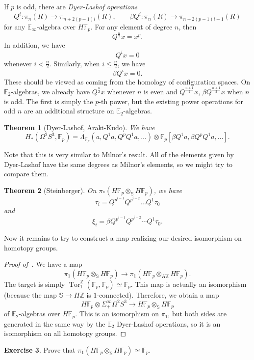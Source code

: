 \documentclass[10pt, oneside]{memoir}
\newtheorem{thm}{Theorem}[subsection]
\theoremstyle{definition}
\newtheorem{exer}[thm]{Exercise}
\theoremstyle{remark}
\theoremstyle{plain}
\theoremstyle{definition}
\theoremstyle{remark}
\newcommand{\Z}{\mathbb{Z}}
\newcommand{\E}{\mathbb{E}}
\newcommand{\F}{\mathbb{F}}
\newcommand{\bS}{\mathbb{S}}
\newcommand{\1}{\mathbf{1}}
\newcommand{\2}{\mathbf{2}}
\newcommand{\3}{\mathbf{3}}
\DeclareMathOperator{\Tor}{Tor}
\begin{document}
If $p$ is odd, there are \textit{Dyer-Lashof operations}
\[ Q^i \colon \pi_n(R) \to \pi_{n+2(p-1)i}(R), \qquad \beta Q^i \colon \pi_n(R) \to \pi_{n+2(p-1)i-1}(R) \]
for any $\E_{\infty}$-algebra over $H \F_p$. For any element of degree $n$, then
\[ Q^{\frac{n}{2}} x = x^p. \]
In addition, we have
\[ Q^i x = 0 \]
whenever $i < \frac{n}{2}$. Similarly, when $i \leq \frac{n}{2}$, we have
\[ \beta Q^i x = 0. \]
These should be viewed as coming from the homology of configuration spaces. On $\E_2$-algebras, we already have $Q^{\frac{n}{2}} x$
whenever $n$ is even and $Q^{\frac{n+1}{2}}x$, $\beta Q^{\frac{n+1}{2}}x$ when $n$ is odd. The first is simply the $p$-th power, but the existing power operations for odd $n$ are an additional structure on $\E_2$-algebras.

\begin{thm}[Dyer-Lashof, Araki-Kudo]
    We have
    \[ H_*(\Omega^2 S^3, \F_p) = \Lambda_{\F_p} (a, Q^1 a, Q^p Q^1 a, \ldots) \otimes \F_p[\beta Q^1 a, \beta Q^p Q^1 a, \ldots]. \]
\end{thm}

Note that this is very similar to Milnor's result. All of the elements given by Dyer-Lashof have the same degrees as Milnor's elements, so we might try to compare them.

\begin{thm}[Steinberger]
    On $\pi_* (H \F_p \otimes_{\bS} H \F_p)$, we have
    \[ \tau_i = Q^{p^{i-1}} Q^{p^{i-2}} \dots Q^1 \tau_0 \]
    and
    \[ \xi_i = \beta Q^{p^{i-1}} Q^{p^{i-2}} \cdots Q^1 \tau_0. \]
\end{thm}

Now it remains to try to construct a map realizing our desired isomorphism on homotopy groups.

\begin{proof}[Proof of~]
    We have a map
    \[ \pi_1 (H \F_p \otimes_{\bS} H \F_p) \to \pi_1 (H \F_p \otimes_{H \Z} H \F_p). \]
    The target is simply $\Tor_1^{\Z}(\F_p, \F_p) \simeq \F_p$. This map is actually an isomorphism (because the map $\bS \to H \Z$ is $1$-connected). Therefore, we obtain a map
    \[ H \F_p \otimes \Sigma_+^{\infty} \Omega^2 S^3 \to H \F_p \otimes_{\bS} H \F_p \]
    of $\E_2$-algebras over $H \F_p$. This is an isomorphism on $\pi_1$, but both sides are generated in the same way by the $\E_2$ Dyer-Lashof operations, so it is an isomorphism on all homotopy groups.
\end{proof}

\begin{exer}
    Prove that $\pi_1(H \F_p \otimes_{\bS} H \F_p) \simeq \F_p$.
\end{exer}
\end{document}
